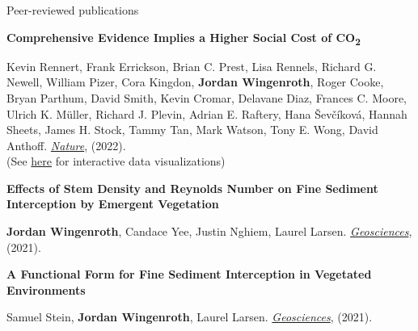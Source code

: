 \documentclass{resume} %
\begin{document}
\begin{rSection}{Peer-reviewed publications}

{\bf Comprehensive Evidence Implies a Higher Social Cost of CO\textsubscript{2}}
\vspace{-7pt}
\begin{adjustwidth}{12pt}{}
{\small Kevin Rennert, Frank Errickson, Brian C. Prest, Lisa Rennels, Richard G. Newell, William Pizer, Cora Kingdon, \textbf{Jordan Wingenroth}, Roger Cooke, Bryan Parthum, David Smith, Kevin Cromar, Delavane Diaz, Frances C. Moore, Ulrich K. M\"{u}ller, Richard J. Plevin, Adrian E. Raftery, Hana \v{S}ev\v{c}\'{i}kov\'{a}, Hannah Sheets, James H. Stock, Tammy Tan, Mark Watson, Tony E. Wong, David Anthoff. \textit{\href{https://www.nature.com/articles/s41586-022-05224-9}{Nature}}, (2022).\\
(See \href{https://www.rff.org/publications/data-tools/scc-explorer/}{here} for interactive data visualizations)}
\end{adjustwidth}

{\bf Effects of Stem Density and Reynolds Number on Fine Sediment Interception by Emergent Vegetation}
\vspace{-7pt}
\begin{adjustwidth}{12pt}{}
{\small \textbf{Jordan Wingenroth}, Candace Yee, Justin Nghiem, Laurel Larsen. \textit{\href{https://www.mdpi.com/2076-3263/11/3/136}{Geosciences}}, (2021).}
\end{adjustwidth}

{\bf A Functional Form for Fine Sediment Interception in Vegetated Environments}
\vspace{-7pt}
\begin{adjustwidth}{12pt}{}
{\small Samuel Stein, \textbf{Jordan Wingenroth}, Laurel Larsen. \textit{\href{https://www.mdpi.com/2076-3263/11/4/157}{Geosciences}}, (2021).}
\end{adjustwidth}

\end{rSection}
\end{document}
